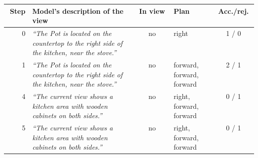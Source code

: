 \begin{tabular}{@{}rp{0.42\linewidth}cp{0.17\linewidth}c@{}}
\toprule
Step & Model's description of the view & In view & Plan & Acc./rej.\\
\midrule
0 & \textit{``The Pot is located on the countertop to the right side of the kitchen, near the stove.''} & no & right & 1 / 0\\
1 & \textit{``The Pot is located on the countertop to the right side of the kitchen, near the stove.''} & no & forward, forward, forward & 2 / 1\\
4 & \textit{``The current view shows a kitchen area with wooden cabinets on both sides.''} & no & right, forward, forward & 0 / 1\\
5 & \textit{``The current view shows a kitchen area with wooden cabinets on both sides.''} & no & right, forward, forward & 0 / 1\\
\bottomrule
\end{tabular}
